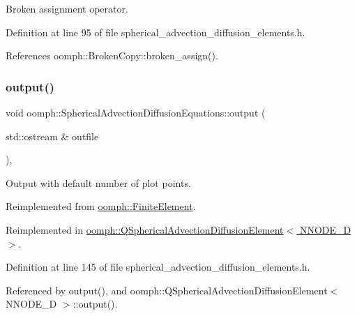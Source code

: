 Broken assignment operator. 



Definition at line 95 of file spherical\+\_\+advection\+\_\+diffusion\+\_\+elements.\+h.



References oomph\+::\+Broken\+Copy\+::broken\+\_\+assign().

\mbox{\label{classoomph_1_1SphericalAdvectionDiffusionEquations_a4b4f59d82dd7b2e1641eba4b91d54d40}} 
\subsubsection{\texorpdfstring{output()}{output()}\hspace{0.1cm}{\footnotesize\ttfamily [1/4]}}
{\footnotesize\ttfamily void oomph\+::\+Spherical\+Advection\+Diffusion\+Equations\+::output (\begin{DoxyParamCaption}\item[{std\+::ostream \&}]{outfile }\end{DoxyParamCaption})\hspace{0.3cm}{\ttfamily [inline]}, {\ttfamily [virtual]}}



Output with default number of plot points. 



Reimplemented from \hyperlink{classoomph_1_1FiniteElement_a2ad98a3d2ef4999f1bef62c0ff13f2a7}{oomph\+::\+Finite\+Element}.



Reimplemented in \hyperlink{classoomph_1_1QSphericalAdvectionDiffusionElement_addf1f59cc684120c3063774ce75a72a4}{oomph\+::\+Q\+Spherical\+Advection\+Diffusion\+Element$<$ N\+N\+O\+D\+E\+\_\+D $>$}.



Definition at line 145 of file spherical\+\_\+advection\+\_\+diffusion\+\_\+elements.\+h.



Referenced by output(), and oomph\+::\+Q\+Spherical\+Advection\+Diffusion\+Element$<$ N\+N\+O\+D\+E\+\_\+D $>$\+::output().

\mbox{\label{classoomph_1_1SphericalAdvectionDiffusionEquations_a0223fcc7ace17c16b0e61c75ddff8bc5}} 
